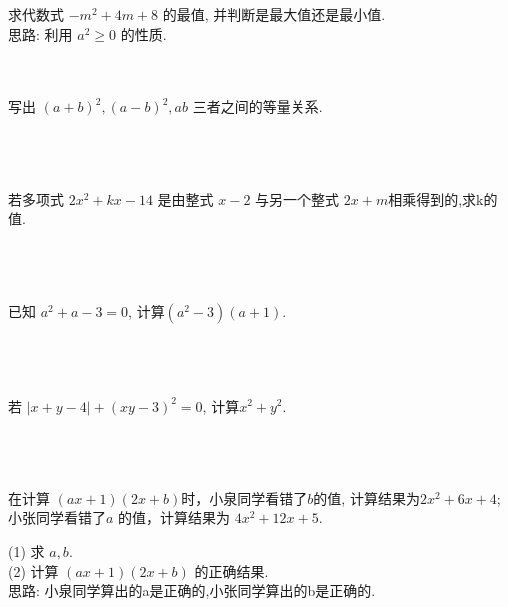 \item {
    求代数式 $-m^2 + 4m + 8$ 的最值, 并判断是最大值还是最小值.
    \ifshowSolution
        \fangsong{}
        \\
        思路: 利用 $a^2 \geq 0$ 的性质.
    \else
        \\ \\ \\
    \fi
}

\item {
    写出 $(a+b)^2, (a-b)^2, ab$ 三者之间的等量关系.
    \ifshowSolution
        \fangsong{}
        \\
    \else
        \\ \\ \\
    \fi
}

\item {
    若多项式 $2x^2 + kx - 14$ 是由整式 $x-2$ 与另一个整式 $2x+m$相乘得到的,求k的值.
    \ifshowSolution
        \fangsong{}
        \\
    \else
        \\ \\ \\
    \fi
}

\item {
    已知 $a^2 + a - 3 = 0$, 计算$(a^2 - 3)(a+1)$.
    \ifshowSolution
        \fangsong{}
        \\
    \else
        \\ \\ \\
    \fi
}

\item {
    若 $\lvert x+y-4 \rvert + (xy-3)^2 = 0$, 计算$x^2 + y^2$.
    \ifshowSolution
        \fangsong{}
        \\
    \else
        \\ \\ \\
    \fi
}

\item {
    在计算 $(ax+1)(2x+b)$时，小泉同学看错了$b$的值, 计算结果为$2x^2 + 6x + 4$; 小张同学看错了$a$ 的值，计算结果为 $4x^2+12x+5$.

    (1) 求 $a,b$.\\
    (2) 计算 $(ax+1)(2x+b)$ 的正确结果.
    \ifshowSolution
        \fangsong{}
        \\
        思路: 小泉同学算出的a是正确的,小张同学算出的b是正确的.
    \else
        \\ \\ \\ \\ 
    \fi
}
